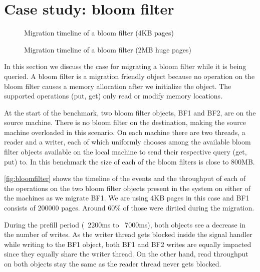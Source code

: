\section{Case study: bloom filter}
\label{sec:evalmigfriendly}

\begin{figure}[tp]
    \begin{center}
        
    \end{center}
    \caption{Migration timeline of a bloom filter (4KB pages)}
    \label{fig:bloomfilter}
\end{figure}


\begin{figure}[tp]
    \begin{center}
        
    \end{center}
    \caption{Migration timeline of a bloom filter (2MB huge pages)}
    \label{fig:bloomfilterhp}
\end{figure}


In this section we discuss the case for migrating a bloom filter while it is
being queried. A bloom filter is a migration friendly object because
no operation on the bloom filter causes a memory allocation after we initialize
the object. The supported operations (put, get) only read or modify memory
locations.

At the start of the benchmark, two bloom filter objects, BF1
and BF2, are on the source machine. There is no bloom filter on the destination,
making the source machine overloaded in this scenario. On each machine there
are two threads, a reader and a writer, each of which uniformly chooses among
the available bloom filter objects available on the local machine to send their
respective query (get, put) to. In this benchmark the size of each of the bloom
filters is close to 800MB.

\autoref{fig:bloomfilter} shows the timeline of the events and the throughput
of each of the operations on the two bloom filter objects present in the system
on either of the machines as we migrate BF1. We are using 4KB pages in this
case and BF1 consists of 200000 pages. Around 60\% of those were dirtied during
the migration.

During the prefill period (~2200ms to ~7000ms), both objects see a decrease in
the number of writes. As the writer thread gets blocked inside the signal
handler while writing to the BF1 object, both BF1 and BF2 writes are equally
impacted since they equally share the writer thread. On the other hand, read
throughput on both objects stay the same as the reader thread never gets
blocked.

